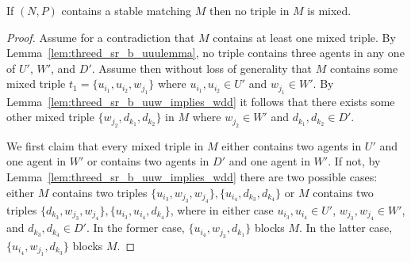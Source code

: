 \begin{lem}
\label{lem:threed_sr_b_ifmisstablemprimeprimeexistswhichisalltypet0}
If $(N, P)$ contains a stable matching $M$ then no triple in $M$ is mixed.
\end{lem}
\begin{proof}
Assume for a contradiction that $M$ contains at least one mixed triple. By Lemma~\ref{lem:threed_sr_b_uuulemma}, no triple contains three agents in any one of $U'$, $W'$, and $D'$. Assume then without loss of generality that $M$ contains some mixed triple $t_1 = \{ u_{i_1}, u_{i_2}, w_{j_1} \}$ where $u_{i_1}, u_{i_2} \in U'$ and $w_{j_1} \in W'$. By Lemma~\ref{lem:threed_sr_b_uuw_implies_wdd} it follows that there exists some other mixed triple $\{ w_{j_2}, d_{k_1}, d_{k_2} \}$ in $M$ where $w_{j_2} \in W'$ and $d_{k_1}, d_{k_2} \in D'$.

We first claim that every mixed triple in $M$ either contains two agents in $U'$ and one agent in $W'$ or contains two agents in $D'$ and one agent in $W'$. If not, by Lemma~\ref{lem:threed_sr_b_uuw_implies_wdd} there are two possible cases: either $M$ contains two triples $\{ u_{i_3}, w_{j_3}, w_{j_4} \}, \{ u_{i_4}, d_{k_3}, d_{k_4} \}$ or $M$ contains two triples $\{ d_{k_3}, w_{j_3}, w_{j_4} \}, \{ u_{i_3}, u_{i_4}, d_{k_4} \}$, where in either case $u_{i_3}, u_{i_4} \in U'$, $w_{j_3}, w_{j_4} \in W'$, and $d_{k_3}, d_{k_4} \in D'$. In the former case, $\{ u_{i_4}, w_{j_3}, d_{k_1} \}$ blocks $M$. In the latter case, $\{ u_{i_4}, w_{j_1}, d_{k_3} \}$ blocks $M$.


\end{proof}
